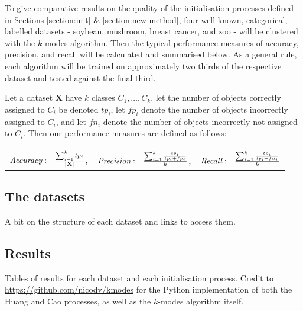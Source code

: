 To give comparative results on the quality of the initialisation processes defined in Sections \ref{section:init} \& \ref{section:new-method}, four well-known, categorical, labelled datasets - soybean, mushroom, breast cancer, and zoo - will be clustered with the $k$-modes algorithm. Then the typical performance measures of accuracy, precision, and recall will be calculated and summarised below. As a general rule, each algorithm will be trained on approximately two thirds of the respective dataset and tested against the final third.

\begin{definition}
	Let a dataset \textbf{X} have $k$ classes $C_1, \ldots, C_k$, let the number of objects correctly assigned to $C_i$ be denoted $tp_i$, let $fp_i$ denote the number of objects incorrectly assigned to $C_i$, and let $fn_i$ denote the number of objects incorrectly not assigned to $C_i$. Then our performance measures are defined as follows: \\
		
		\centering
		\begin{tabular}{ccc}
			$\emph{Accuracy}: \ \ \frac{\sum_{i=1}^{k}{tp_i}}{|\textbf{X}|}$, &
			
			$\emph{Precision}: \ \ \frac{\sum_{i=1}^{k} \frac{tp_i}{tp_i + fp_i}}{k}$, &
			
			$\emph{Recall}: \ \ \frac{\sum_{i=1}^{k} \frac{tp_i}{tp_i + fn_i}}{k}$ \\
		\end{tabular}
\end{definition}


\subsection{The datasets}\label{subsection:datasets}

A bit on the structure of each dataset and links to access them.


\subsection{Results}\label{subsection:results}

Tables of results for each dataset and each initialisation process. Credit to \url{https://github.com/nicodv/kmodes} for the Python implementation of both the Huang and Cao processes, as well as the $k$-modes algorithm itself.

\begin{example}
\begin{figure}
    \centering
    
\end{figure}
\end{example}

